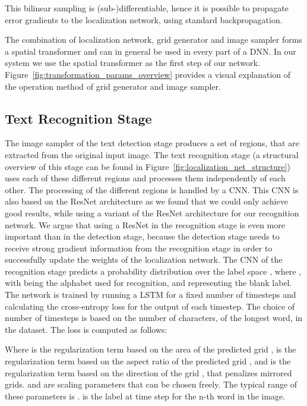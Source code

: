 \documentclass[letterpaper]{article}
\begin{document}
		This bilinear sampling is (sub-)differentiable, hence it is possible to propagate error gradients to the localization network, using standard backpropagation.

	The combination of localization network, grid generator and image sampler forms a spatial transformer and can in general be used in every part of a \ac{DNN}.
	In our system we use the spatial transformer as the first step of our network.
	Figure~\ref{fig:transformation_params_overview} provides a visual explanation of the operation method of grid generator and image sampler.


	\subsection{Text Recognition Stage}

	The image sampler of the text detection stage produces a set of  regions, that are extracted from the original input image.
	The text recognition stage (a structural overview of this stage can be found in Figure~\ref{fig:localization_net_structure}) uses each of these  different regions and processes them independently of each other.
	The processing of the  different regions is handled by a \ac{CNN}.
	This \ac{CNN} is also based on the ResNet architecture as we found that we could only achieve good results, while using a variant of the ResNet architecture for our recognition network.
	We argue that using a ResNet in the recognition stage is even more important than in the detection stage, because the detection stage needs to receive strong gradient information from the recognition stage in order to successfully update the weights of the localization network.
	The \ac{CNN} of the recognition stage predicts a probability distribution  over the label space , where , with  being the alphabet used for recognition, and  representing the blank label.
	The network is trained by running a \ac{LSTM} for a fixed number of  timesteps and calculating the cross-entropy loss for the output of each timestep.
	The choice of number of timesteps  is based on the number of characters, of the longest word, in the dataset.
	The loss  is computed as follows:
	
	Where  is the regularization term based on the area of the predicted grid ,  is the regularization term based on the aspect ratio of the predicted grid , and  is the regularization term based on the direction of the grid , that penalizes mirrored grids.
	 and  are scaling parameters that can be chosen freely.
	The typical range of these parameters is .
	 is the label  at time step  for the n-th word in the image.
\end{document}
